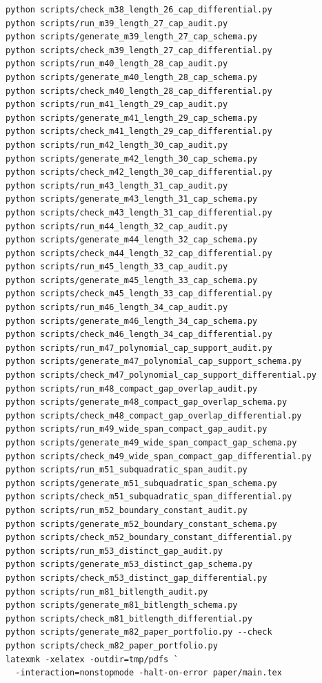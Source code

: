 \documentclass[11pt]{article}
\begin{document}
\begin{verbatim}
python scripts/check_m38_length_26_cap_differential.py
python scripts/run_m39_length_27_cap_audit.py
python scripts/generate_m39_length_27_cap_schema.py
python scripts/check_m39_length_27_cap_differential.py
python scripts/run_m40_length_28_cap_audit.py
python scripts/generate_m40_length_28_cap_schema.py
python scripts/check_m40_length_28_cap_differential.py
python scripts/run_m41_length_29_cap_audit.py
python scripts/generate_m41_length_29_cap_schema.py
python scripts/check_m41_length_29_cap_differential.py
python scripts/run_m42_length_30_cap_audit.py
python scripts/generate_m42_length_30_cap_schema.py
python scripts/check_m42_length_30_cap_differential.py
python scripts/run_m43_length_31_cap_audit.py
python scripts/generate_m43_length_31_cap_schema.py
python scripts/check_m43_length_31_cap_differential.py
python scripts/run_m44_length_32_cap_audit.py
python scripts/generate_m44_length_32_cap_schema.py
python scripts/check_m44_length_32_cap_differential.py
python scripts/run_m45_length_33_cap_audit.py
python scripts/generate_m45_length_33_cap_schema.py
python scripts/check_m45_length_33_cap_differential.py
python scripts/run_m46_length_34_cap_audit.py
python scripts/generate_m46_length_34_cap_schema.py
python scripts/check_m46_length_34_cap_differential.py
python scripts/run_m47_polynomial_cap_support_audit.py
python scripts/generate_m47_polynomial_cap_support_schema.py
python scripts/check_m47_polynomial_cap_support_differential.py
python scripts/run_m48_compact_gap_overlap_audit.py
python scripts/generate_m48_compact_gap_overlap_schema.py
python scripts/check_m48_compact_gap_overlap_differential.py
python scripts/run_m49_wide_span_compact_gap_audit.py
python scripts/generate_m49_wide_span_compact_gap_schema.py
python scripts/check_m49_wide_span_compact_gap_differential.py
python scripts/run_m51_subquadratic_span_audit.py
python scripts/generate_m51_subquadratic_span_schema.py
python scripts/check_m51_subquadratic_span_differential.py
python scripts/run_m52_boundary_constant_audit.py
python scripts/generate_m52_boundary_constant_schema.py
python scripts/check_m52_boundary_constant_differential.py
python scripts/run_m53_distinct_gap_audit.py
python scripts/generate_m53_distinct_gap_schema.py
python scripts/check_m53_distinct_gap_differential.py
python scripts/run_m81_bitlength_audit.py
python scripts/generate_m81_bitlength_schema.py
python scripts/check_m81_bitlength_differential.py
python scripts/generate_m82_paper_portfolio.py --check
python scripts/check_m82_paper_portfolio.py
latexmk -xelatex -outdir=tmp/pdfs `
  -interaction=nonstopmode -halt-on-error paper/main.tex
\end{verbatim}
\end{document}
